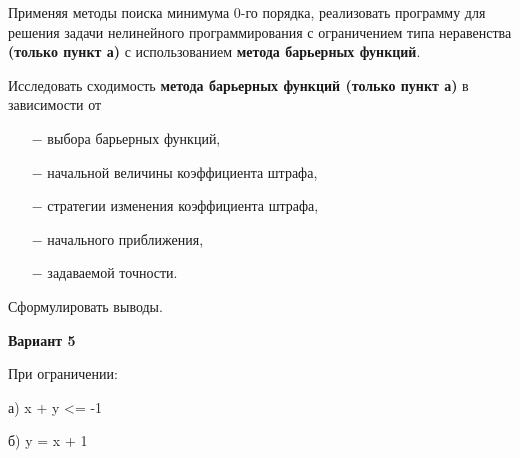 \documentclass[12pt, a4paper]{article}
\begin{document}
Применяя методы поиска минимума 0-го порядка, реализовать программу для решения задачи нелинейного программирования с ограничением типа неравенства {\bf (только пункт а)} с использованием {\bf метода барьерных функций}.

Исследовать сходимость {\bf метода барьерных функций (только пункт а)} в зависимости от

\begin{itemize}
	\item[$-$]выбора барьерных функций,
	\item[$-$]начальной величины коэффициента штрафа,
	\item[$-$]стратегии изменения коэффициента штрафа,
	\item[$-$]начального приближения,
	\item[$-$]задаваемой точности.
\end{itemize}

Сформулировать выводы.

{\bf Вариант 5}

При ограничении:

а) x + y <= -1

б) y = x + 1




\end{document}
